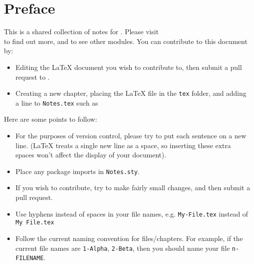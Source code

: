 \section*{Preface}
This is a shared collection of notes for \modulename. Please visit \\
\repolink{} to find out more, and to see other modules. You can contribute to this document by:
\begin{itemize}
	\item Editing the \LaTeX{} document you wish to contribute to, then submit a pull request to \repolink.
	\item Creating a new chapter, placing the \LaTeX{} file in the \verb|tex| folder, and adding a line to \verb|Notes.tex| such as \verb||
\end{itemize}
%
Here are some points to follow:
\begin{itemize}
	\item For the purposes of version control, please try to put each sentence on a new line. (\LaTeX{} treats a single new line as a space, so inserting these extra spaces won't affect the display of your document).
	\item Place any package imports in \verb|Notes.sty|.
	\item If you wish to contribute, try to make fairly small changes, and then submit a pull request.
	\item Use hyphens instead of spaces in your file names, e.g. \verb|My-File.tex| instead of \verb|My File.tex|
	\item Follow the current naming convention for files/chapters. For example, if the current file names are \verb|1-Alpha|, \verb|2-Beta|, then you should name your file \verb|n-FILENAME|.
\end{itemize}